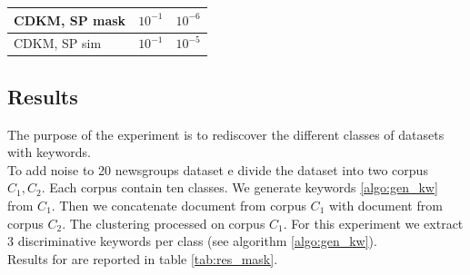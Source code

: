 \begin{table}
{\begin{tabular}{|l|l|l|}
       CDKM, SP mask  &$10^{-1}$  &$10^{-6}$         \\ \hline
       CDKM, SP sim   &$10^{-1}$  &$10^{-5}$         \\ \hline
\end{tabular}
}
\end{table}

\subsection{\label{seq:results}Results}
The purpose of the experiment is to rediscover the different classes of 
datasets with keywords.\\
To add noise to 20 newsgroups dataset e divide the dataset into two corpus $C_1, C_2$. 
Each corpus contain ten classes. We generate keywords \ref{algo:gen_kw} 
from $C_1$. Then we concatenate document from corpus $C_1$ with document
from corpus $C_2$. The clustering processed on corpus $C_1$. For this experiment
we extract 3 discriminative keywords per class (see algorithm \ref{algo:gen_kw}).
\\Results for are reported in table \ref{tab:res_mask}.

